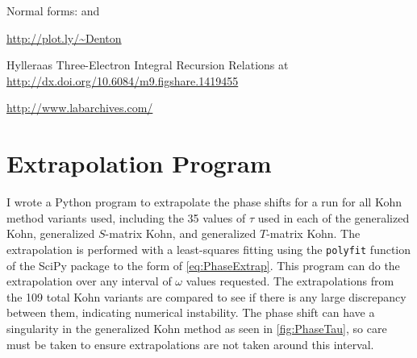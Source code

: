 \documentclass[Dissertation.tex]{subfiles}
\begin{document}
Normal forms:
\cite{Phlonx} and \cite{Kent1983}


\url{http://plot.ly/~Denton}



Hylleraas Three-Electron Integral Recursion Relations at \url{http://dx.doi.org/10.6084/m9.figshare.1419455}

\url{http://www.labarchives.com/}





\section{Extrapolation Program}
I wrote a Python \cite{Python} program to extrapolate the phase shifts for a 
run for all Kohn method variants used, including the 35 values of $\tau$ used 
in each of the generalized Kohn, generalized $S$-matrix Kohn, and generalized
$T$-matrix Kohn. The extrapolation is performed with a least-squares fitting 
using the \texttt{polyfit} function of the SciPy package \cite{SciPy} to the 
form of \cref{eq:PhaseExtrap}. This program can do the extrapolation over any 
interval of $\omega$ values requested. The extrapolations from the 109 total 
Kohn variants are compared to see if there is any large discrepancy between 
them, indicating numerical instability. The phase shift can have a 
singularity in the generalized Kohn method as seen in \cref{fig:PhaseTau}, so 
care must be taken to ensure extrapolations are not taken around this interval.


\biblio
\end{document}
